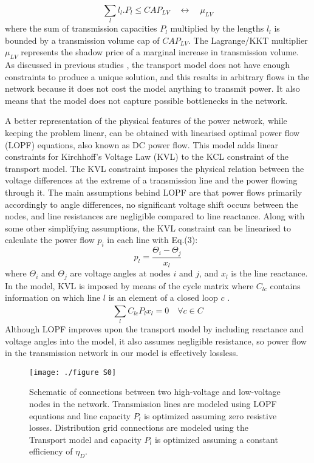 	\begin{equation}
		\sum_{l}^{} l_{l}.P_{l}\leq CAP_{LV} \quad\leftrightarrow \quad\mu_{LV}
	\end{equation}
	where the sum of transmission capacities \(P_{l}\) multiplied by the lengths \(l_{l}\) is bounded by a transmission volume cap of \(CAP_{LV}\). The Lagrange/KKT multiplier \(\mu_{LV}\) represents the shadow price of a marginal increase in transmission volume. As discussed in previous studies , the transport model does not have enough constraints to produce a unique solution, and this results in arbitrary flows in the network because it does not cost the model anything to transmit power. It also means that the model does not capture possible bottlenecks in the network.
	
	A better representation of the physical features of the power network, while keeping the problem linear, can be obtained with linearised optimal power flow (LOPF) equations, also known as DC power flow. This model adds linear constraints for Kirchhoff’s Voltage Law (KVL) to the KCL constraint of the transport model. The KVL constraint imposes the physical relation between the voltage differences at the extreme of a transmission line and the power flowing through it. The main assumptions behind LOPF are that power flows primarily accordingly to angle differences, no significant voltage shift occurs between the nodes, and line resistances are negligible compared to line reactance. Along with some other simplifying assumptions, the KVL constraint can be linearised to calculate the power flow \(p_{i}\) in each line with Eq.(3):
	\begin{equation}
		p_{l} = \frac{\Theta_{i}-\Theta_{j}}{x_{l}}
	\end{equation}
	where \(\Theta_{i}\) and \(\Theta_{j}\) are voltage angles at nodes \(i\) and \(j\), and \(x_{l}\) is the line reactance. In the model, KVL is imposed by means of the cycle matrix where \(C_{lc}\) contains information on which line \(l\) is an element of a closed loop \(c\) .
	\begin{equation}
		\sum_{l}^{} C_{lc}P_{l}x_{l}=0 \quad \forall c\in C
	\end{equation}
	Although LOPF improves upon the transport model by including reactance and voltage angles into the model, it also assumes negligible resistance, so power flow in the transmission network in our model is effectively lossless.
	\begin{figure}[H]
		\renewcommand*{\thefigure}{S\arabic{figure}}
		\texttt{[image: ./figure S0]}
		\caption{Schematic of connections between two high-voltage and low-voltage nodes in the network. Transmission lines are modeled using LOPF equations and line capacity \(P_{l}\) is optimized assuming zero resistive losses. Distribution grid connections are modeled using the Transport model and  capacity \(P_{l}\) is optimized assuming a constant efficiency of \(\eta_{D}\). }
	\end{figure}
